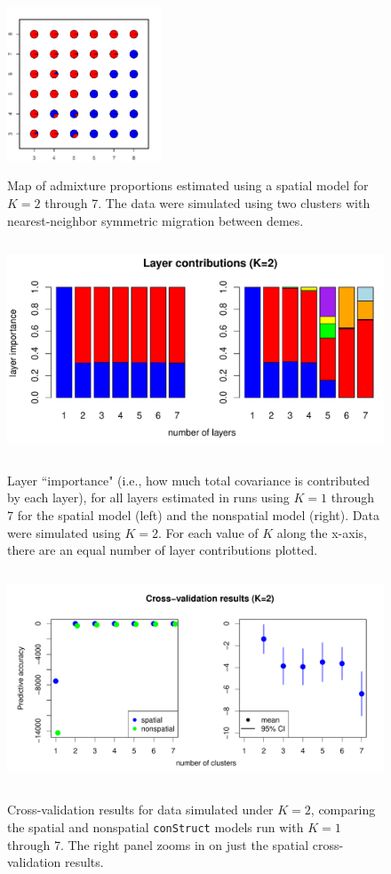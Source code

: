 \documentclass[12pt]{article}
\begin{document}
\begin{figure}
			{\includegraphics[width=1.8in,height=1.8in]{figs/sims/simK2_sp_pies_K7.pdf}}
	\caption{
	Map of admixture proportions estimated using a spatial model for $K=2$ through 7.
	The data were simulated using two clusters with nearest-neighbor symmetric migration between demes.
    }\label{simK2_sp_pies}
\end{figure}

\begin{figure}
	\centering
		{\includegraphics[width=5in,height=2.5in]{figs/sims/simK2_laycon_barplots.pdf}}
		\caption{
			Layer ``importance" (i.e., how much total covariance is contributed by each layer), 
			for all layers estimated in runs using $K = 1$ through 7 
			for the spatial model (left) and the nonspatial model (right).
			Data were simulated using $K=2$.
			For each value of $K$ along the x-axis, there are an equal number of layer contributions plotted.
		}\label{simK2_laycon}
\end{figure}

\begin{figure}
	\centering
		{\includegraphics[width=5in,height=2.5in]{figs/sims/simK2_std_xval.pdf}}
		\caption{
			Cross-validation results for data simulated under $K=2$,
			comparing the spatial and nonspatial \texttt{conStruct} models run with $K=1$ through 7.  
			The right panel zooms in on just the spatial cross-validation results.
		}\label{simK2_xval}
\end{figure}
\end{document}
